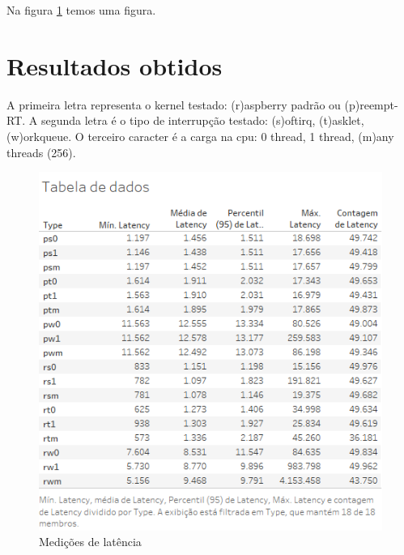 Na figura \ref{tableau} temos uma figura.

\section{Resultados obtidos}

A primeira letra representa o kernel testado: (r)aspberry padrão ou (p)reempt-RT.
A segunda letra é o tipo de interrupção testado: (s)oftirq, (t)asklet, (w)orkqueue.
O terceiro caracter é a carga na cpu: 0 thread, 1 thread, (m)any threads (256).

\begin{figure}[!htb]
    \centering
    \includegraphics{graficos/tableau.png}
    \caption{Medições de latência}
    \label{tableau}
\end{figure}
